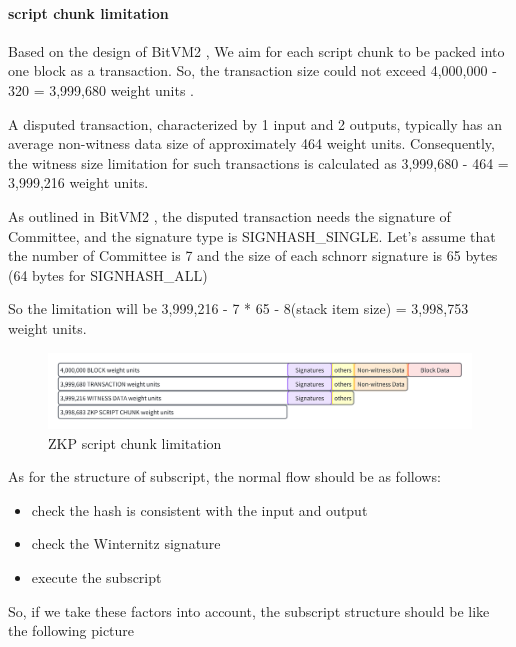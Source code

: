 \paragraph*{script chunk limitation} 

Based on the design of BitVM2 \cite{website:BitVM2}, We aim for each script chunk to be packed into one block as a transaction.
So, the transaction size could not exceed 4,000,000 - 320 = 3,999,680 weight units \cite{website:transaction-size}.

A disputed transaction, characterized by 1 input and 2 outputs, typically has an average non-witness data size of approximately 464 weight units. 
Consequently, the witness size limitation for such transactions is calculated as 3,999,680 - 464 = 3,999,216 weight units.

As outlined in BitVM2 \cite{website:BitVM2}, the disputed transaction needs the signature of Committee, and the signature type is
SIGNHASH\_SINGLE. Let's assume that the number of Committee is 7 and the size of each schnorr signature is 65 bytes (64 bytes for SIGNHASH\_ALL)

So the limitation will be 3,999,216 - 7 * 65 - 8(stack item size) = 3,998,753 weight units.

\begin{figure}[ht] 
    \centering  
    \includegraphics[width=0.85\columnwidth]{images/ZKP-script-chunk-limitation.png} 
    \caption{ZKP script chunk limitation}
    \label{fig:ZKP-script-chunk-limitation}
\end{figure}

As for the structure of subscript, the normal flow should be as follows:

\begin{itemize}
    \item check the hash \cite{website:blake3} is consistent with the input and output
    \item check the Winternitz \cite{website:witernitz} signature
    \item execute the subscript
\end{itemize}

So, if we take these factors into account, the subscript structure should be like the following picture

